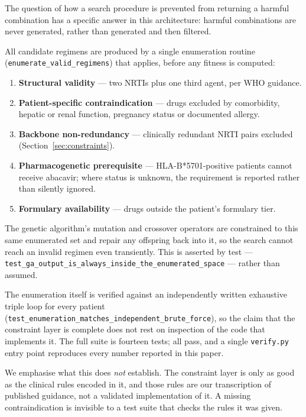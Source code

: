 \documentclass[conference]{IEEEtran}
\begin{document}
The question of how a search procedure is prevented from returning a harmful combination has a specific answer in this architecture: harmful combinations are never generated, rather than generated and then filtered.

All candidate regimens are produced by a single enumeration routine (\texttt{enumerate\_\allowbreak{}valid\_\allowbreak{}regimens}) that applies, before any fitness is computed:

\begin{enumerate}
\item \textbf{Structural validity} --- two NRTIs plus one third agent, per WHO guidance.
\item \textbf{Patient-specific contraindication} --- drugs excluded by comorbidity, hepatic or renal function, pregnancy status or documented allergy.
\item \textbf{Backbone non-redundancy} --- clinically redundant NRTI pairs excluded (Section~\ref{sec:constraints}).
\item \textbf{Pharmacogenetic prerequisite} --- HLA-B*5701-positive patients cannot receive abacavir; where status is unknown, the requirement is reported rather than silently ignored.
\item \textbf{Formulary availability} --- drugs outside the patient's formulary tier.
\end{enumerate}

The genetic algorithm's mutation and crossover operators are constrained to this same enumerated set and repair any offspring back into it, so the search cannot reach an invalid regimen even transiently. This is asserted by test --- \texttt{test\_\allowbreak{}ga\_\allowbreak{}output\_\allowbreak{}is\_\allowbreak{}always\_\allowbreak{}inside\_\allowbreak{}the\_\allowbreak{}enumerated\_\allowbreak{}space} --- rather than assumed.

The enumeration itself is verified against an independently written exhaustive triple loop for every patient (\texttt{test\_\allowbreak{}enumeration\_\allowbreak{}matches\_\allowbreak{}independent\_\allowbreak{}brute\_\allowbreak{}force}), so the claim that the constraint layer is complete does not rest on inspection of the code that implements it. The full suite is fourteen tests; all pass, and a single \texttt{verify.py} entry point reproduces every number reported in this paper.

We emphasise what this does \textit{not} establish. The constraint layer is only as good as the clinical rules encoded in it, and those rules are our transcription of published guidance, not a validated implementation of it. A missing contraindication is invisible to a test suite that checks the rules it was given.
\end{document}
